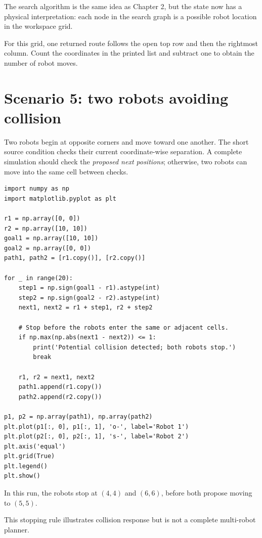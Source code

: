\begin{intuition}
The search algorithm is the same idea as Chapter 2, but the state now has a physical interpretation: each node in the search graph is a possible robot location in the workspace grid.
\end{intuition}

For this grid, one returned route follows the open top row and then the rightmost column. Count the coordinates in the printed list and subtract one to obtain the number of robot moves.

\section{Scenario 5: two robots avoiding collision}

Two robots begin at opposite corners and move toward one another. The short source condition checks their current coordinate-wise separation. A complete simulation should check the \emph{proposed next positions}; otherwise, two robots can move into the same cell between checks.

\begin{lstlisting}[style=mlpython]
import numpy as np
import matplotlib.pyplot as plt

r1 = np.array([0, 0])
r2 = np.array([10, 10])
goal1 = np.array([10, 10])
goal2 = np.array([0, 0])
path1, path2 = [r1.copy()], [r2.copy()]

for _ in range(20):
    step1 = np.sign(goal1 - r1).astype(int)
    step2 = np.sign(goal2 - r2).astype(int)
    next1, next2 = r1 + step1, r2 + step2

    # Stop before the robots enter the same or adjacent cells.
    if np.max(np.abs(next1 - next2)) <= 1:
        print('Potential collision detected; both robots stop.')
        break

    r1, r2 = next1, next2
    path1.append(r1.copy())
    path2.append(r2.copy())

p1, p2 = np.array(path1), np.array(path2)
plt.plot(p1[:, 0], p1[:, 1], 'o-', label='Robot 1')
plt.plot(p2[:, 0], p2[:, 1], 's-', label='Robot 2')
plt.axis('equal')
plt.grid(True)
plt.legend()
plt.show()
\end{lstlisting}

In this run, the robots stop at \((4,4)\) and \((6,6)\), before both propose moving to \((5,5)\).

\begin{pitfall}
This stopping rule illustrates collision response but is not a complete multi-robot planner.
\end{pitfall}

